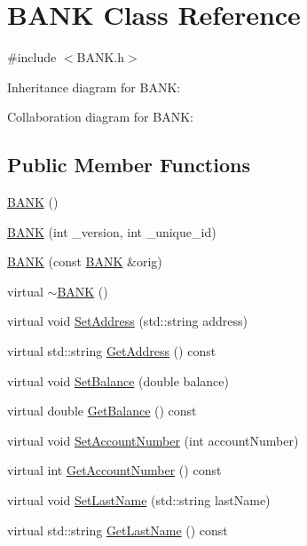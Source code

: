 \hypertarget{class_b_a_n_k}{}\section{B\+A\+NK Class Reference}
\label{class_b_a_n_k}


{\ttfamily \#include $<$B\+A\+N\+K.\+h$>$}



Inheritance diagram for B\+A\+NK\+:


Collaboration diagram for B\+A\+NK\+:
\subsection*{Public Member Functions}
\begin{DoxyCompactItemize}
\item 
\hyperlink{class_b_a_n_k_a0bc938356cebff14fb0560264abe5a34}{B\+A\+NK} ()
\item 
\hyperlink{class_b_a_n_k_a7382dd275d8f4f10a8b53ccbc93e1e87}{B\+A\+NK} (int \+\_\+version, int \+\_\+unique\+\_\+id)
\item 
\hyperlink{class_b_a_n_k_a4dd657c30039ea00a040e6226c23ccd4}{B\+A\+NK} (const \hyperlink{class_b_a_n_k}{B\+A\+NK} \&orig)
\item 
virtual \hyperlink{class_b_a_n_k_ad609a1e004efdebab6495d95eced2346}{$\sim$\+B\+A\+NK} ()
\item 
virtual void \hyperlink{class_b_a_n_k_a52ad99454b2059d44967868157208393}{Set\+Address} (std\+::string address)
\item 
virtual std\+::string \hyperlink{class_b_a_n_k_a358741f647f9494026e02fd3fd27cde6}{Get\+Address} () const 
\item 
virtual void \hyperlink{class_b_a_n_k_ae3e45b407bf8ec7175662442ea24b7c0}{Set\+Balance} (double balance)
\item 
virtual double \hyperlink{class_b_a_n_k_a7ac46c74859cebdc933cb27e148d18b1}{Get\+Balance} () const 
\item 
virtual void \hyperlink{class_b_a_n_k_a9d8fb8bde35d63eca7e9f87d22b45752}{Set\+Account\+Number} (int account\+Number)
\item 
virtual int \hyperlink{class_b_a_n_k_a62adf3cea60d863a4a10eeee485fa1aa}{Get\+Account\+Number} () const 
\item 
virtual void \hyperlink{class_b_a_n_k_a2dc1b7664f9e3b005cb33e71b2ba42ee}{Set\+Last\+Name} (std\+::string last\+Name)
\item 
virtual std\+::string \hyperlink{class_b_a_n_k_a4612063ec2bfd6d883a77a0d3697af90}{Get\+Last\+Name} () const 

\end{DoxyCompactItemize}

